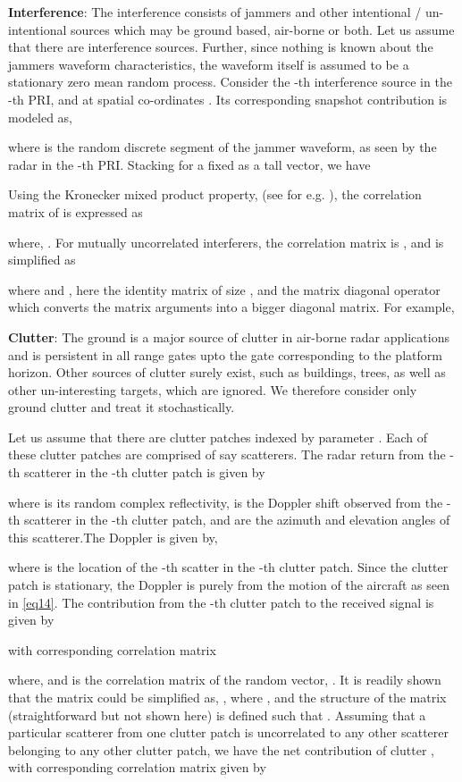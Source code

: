 \documentclass[11pt,draftclsnofoot,onecolumn]{IEEEtran}
\theoremstyle{definition}
\theoremstyle{remark}
\begin{document}
{\bf Interference}: The interference consists of jammers and other intentional / un-intentional sources which may be ground based, air-borne or both. Let us assume that there are  interference sources. Further, since nothing is known about the jammers waveform characteristics, the waveform itself is assumed to be a stationary zero mean random process. Consider the -th interference source in the -th PRI, and at spatial co-ordinates . Its corresponding snapshot contribution is modeled as,

where  is the random discrete segment of the jammer waveform, as seen by the radar in the -th PRI. Stacking  for a fixed  as a tall vector, we have 

Using the Kronecker mixed product property, (see for e.g. \cite{horn1994}), the correlation matrix of  is expressed as 

where, . For  mutually uncorrelated interferers, the correlation matrix is , and is simplified as

where  and , 
here  the identity matrix of size , and  the matrix diagonal operator which converts the matrix arguments into a bigger diagonal matrix. For example, 

{\bf Clutter}: The ground is a major source of clutter in air-borne radar applications and is persistent in all range gates upto the gate corresponding to the platform horizon. Other sources of clutter surely exist, such as buildings, trees, as well as other un-interesting targets, which are ignored. We therefore consider only  ground clutter and treat it stochastically.

Let us assume that there are  clutter patches indexed by parameter . Each of these clutter patches are comprised of say  scatterers. The radar return from the -th scatterer in the -th clutter patch is given by

where  is its random complex reflectivity,  is the Doppler shift observed from the -th scatterer in the -th clutter patch, and  are the azimuth and elevation angles of this scatterer.The Doppler  is given by,

where  is the location of the -th scatter in the -th clutter patch. Since the clutter patch is stationary, the Doppler is purely from the motion of the aircraft as seen in \eqref{eq14}. The contribution from the -th clutter patch to the received signal is given by

with corresponding correlation matrix 

where, 
 and  is the correlation matrix of the random vector, . It is readily shown that the matrix  could be simplified as, , where , and the structure of the matrix  (straightforward but not shown here) is defined such that . Assuming that a particular scatterer from one clutter patch is uncorrelated to any other scatterer belonging to any other clutter patch, we have the net contribution of clutter , with corresponding correlation matrix given by
\end{document}
